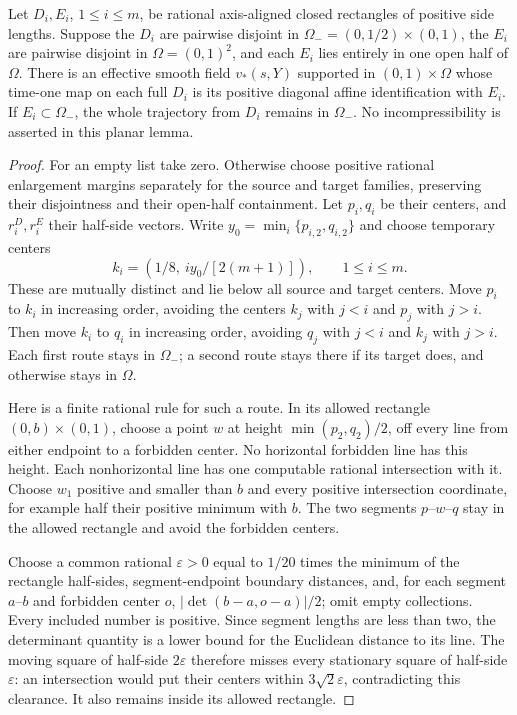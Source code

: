 \begin{lemma}\label{bcs:prefix-planar}
Let $D_i,E_i$, $1\le i\le m$, be rational axis-aligned closed rectangles of positive side lengths. Suppose the $D_i$ are pairwise disjoint in $\Omega_-=(0,1/2)\times(0,1)$, the $E_i$ are pairwise disjoint in $\Omega=(0,1)^2$, and each $E_i$ lies entirely in one open half of $\Omega$. There is an effective smooth field $v_*(s,Y)$ supported in $(0,1)\times\Omega$ whose time-one map on each full $D_i$ is its positive diagonal affine identification with $E_i$. If $E_i\subset\Omega_-$, the whole trajectory from $D_i$ remains in $\Omega_-$. No incompressibility is asserted in this planar lemma.
\end{lemma}
\begin{proof}
For an empty list take zero. Otherwise choose positive rational enlargement margins separately for the source and target families, preserving their disjointness and their open-half containment. Let $p_i,q_i$ be their centers, and $r_i^D,r_i^E$ their half-side vectors. Write $y_0=\min_i\{p_{i,2},q_{i,2}\}$ and choose temporary centers
\[
 k_i=(1/8,\ i y_0/[2(m+1)]),\qquad 1\le i\le m.
\]
These are mutually distinct and lie below all source and target centers. Move $p_i$ to $k_i$ in increasing order, avoiding the centers $k_j$ with $j<i$ and $p_j$ with $j>i$. Then move $k_i$ to $q_i$ in increasing order, avoiding $q_j$ with $j<i$ and $k_j$ with $j>i$. Each first route stays in $\Omega_-$; a second route stays there if its target does, and otherwise stays in $\Omega$.

Here is a finite rational rule for such a route. In its allowed rectangle $(0,b)\times(0,1)$, choose a point $w$ at height $\min(p_2,q_2)/2$, off every line from either endpoint to a forbidden center. No horizontal forbidden line has this height. Each nonhorizontal line has one computable rational intersection with it. Choose $w_1$ positive and smaller than $b$ and every positive intersection coordinate, for example half their positive minimum with $b$. The two segments $p$--$w$--$q$ stay in the allowed rectangle and avoid the forbidden centers.

Choose a common rational $\varepsilon>0$ equal to $1/20$ times the minimum of the rectangle half-sides, segment-endpoint boundary distances, and, for each segment $a$--$b$ and forbidden center $o$, $|\det(b-a,o-a)|/2$; omit empty collections. Every included number is positive. Since segment lengths are less than two, the determinant quantity is a lower bound for the Euclidean distance to its line. The moving square of half-side $2\varepsilon$ therefore misses every stationary square of half-side $\varepsilon$: an intersection would put their centers within $3\sqrt2\varepsilon$, contradicting this clearance. It also remains inside its allowed rectangle.


\end{proof}
